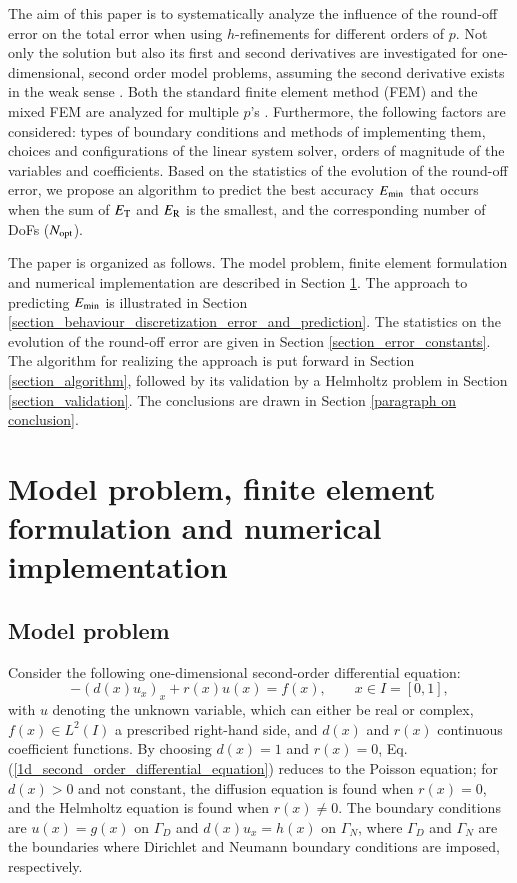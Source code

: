 \documentclass[review,3p]{elsarticle}
\newcommand{\apostrophe}[1]{\rq{#1}}			%
\begin{document}
The aim of this paper is to systematically analyze the influence of the round-off error on the total error when using $h$-refinements for different orders of $p$. Not only the solution but also its first and second derivatives are investigated for one-dimensional, second order model problems, assuming the second derivative exists in the weak sense \cite{necas2011direct}. Both the standard finite element method (FEM) and the mixed FEM \cite{boffi2013mixed} are analyzed for multiple $p$\apostrophe s . Furthermore, the following factors are considered: types of boundary conditions and methods of implementing them, choices and configurations of the linear system solver, orders of magnitude of the variables and coefficients. Based on the statistics of the evolution of the round-off error, we propose an algorithm to predict the best accuracy $E_{\rm min}$ that occurs when the sum of $E_{\rm T}$ and $E_{\rm R}$ is the smallest, and the corresponding number of DoFs ($N_{\rm opt}$).

The paper is organized as follows. The model problem, finite element formulation and numerical implementation are described in Section \ref{section_model_problem_FEM_formulation_numerical_implementation}. The approach to predicting ${E}_{\rm {min}}$ is illustrated in Section \ref{section_behaviour_discretization_error_and_prediction}. The statistics on the evolution of the round-off error are given in Section \ref{section_error_constants}. The algorithm for realizing the approach is put forward in Section \ref{section_algorithm}, followed by its validation by a Helmholtz problem in Section \ref{section_validation}. The conclusions are drawn in Section \ref{paragraph on conclusion}.


\section{Model problem, finite element formulation and numerical implementation}	\label{section_model_problem_FEM_formulation_numerical_implementation}

\subsection{Model problem}

Consider the following one-dimensional second-order differential equation:
\begin{equation}
  -\left(d(x) u_x \right)_x + r(x)u(x) = f(x),\qquad x \in I = [0,1],	\label{1d_second_order_differential_equation}
\end{equation}
with $u$ denoting the unknown variable, which can either be real or complex, $f(x) \in L^2 (I)$ a prescribed right-hand side, and $d(x)$ and $r(x)$ continuous coefficient functions.
By choosing $d(x)=1$ and $r(x)=0$, Eq. (\ref{1d_second_order_differential_equation}) reduces to the Poisson equation; for $d(x)>0$ and not constant, the diffusion equation is found when $r(x)=0$, and the Helmholtz equation \citep{haberman2012applied} is found when $r(x) \neq 0$. 
The boundary conditions are $u(x)=g(x)$ on $\Gamma_D$ and $d(x)u_x=h(x)$ on $\Gamma_N$, where $\Gamma_D$ and $\Gamma_N$ are the boundaries where Dirichlet and Neumann boundary conditions are imposed, respectively.
\end{document}
